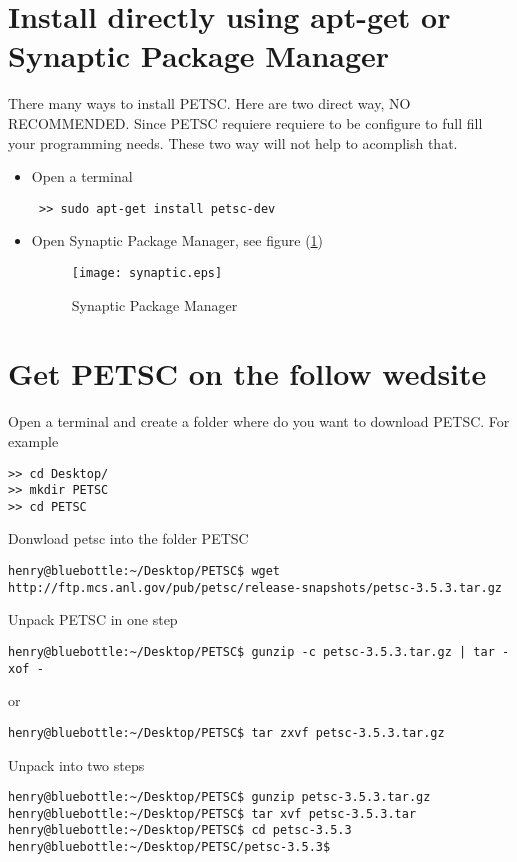 \documentclass{article}
\begin{document}
\section{Install directly using apt-get or Synaptic Package Manager}
There many ways to install PETSC. Here are two direct way, NO RECOMMENDED. Since PETSC requiere requiere to be configure to full fill your programming needs.
These two way will not help to acomplish that.
\begin{itemize}
 \item Open a terminal
\begin{verbatim} 
 >> sudo apt-get install petsc-dev 
\end{verbatim}
\item Open Synaptic Package Manager, see figure (\ref{Synaptic})
\begin{figure}[h!]
    \centering
    \texttt{[image: synaptic.eps]}
    \caption{Synaptic Package Manager}
    \label{Synaptic}
\end{figure}
\end{itemize}
\section{Get PETSC on the follow wedsite}
Open a terminal and create a folder where do you want to download PETSC. For example
\begin{scriptsize}\begin{verbatim}
>> cd Desktop/
>> mkdir PETSC
>> cd PETSC
\end{verbatim}\end{scriptsize}
Donwload petsc into the folder PETSC
\begin{scriptsize}\begin{verbatim}
henry@bluebottle:~/Desktop/PETSC$ wget http://ftp.mcs.anl.gov/pub/petsc/release-snapshots/petsc-3.5.3.tar.gz
\end{verbatim}\end{scriptsize}
Unpack PETSC in one step
\begin{scriptsize}\begin{verbatim}
henry@bluebottle:~/Desktop/PETSC$ gunzip -c petsc-3.5.3.tar.gz | tar -xof -
\end{verbatim}\end{scriptsize}
or 
\begin{scriptsize}\begin{verbatim}
henry@bluebottle:~/Desktop/PETSC$ tar zxvf petsc-3.5.3.tar.gz
\end{verbatim}\end{scriptsize}
Unpack into two steps
\begin{scriptsize}\begin{verbatim}
henry@bluebottle:~/Desktop/PETSC$ gunzip petsc-3.5.3.tar.gz
henry@bluebottle:~/Desktop/PETSC$ tar xvf petsc-3.5.3.tar
henry@bluebottle:~/Desktop/PETSC$ cd petsc-3.5.3
henry@bluebottle:~/Desktop/PETSC/petsc-3.5.3$ 
\end{verbatim}\end{scriptsize}
\end{document}
